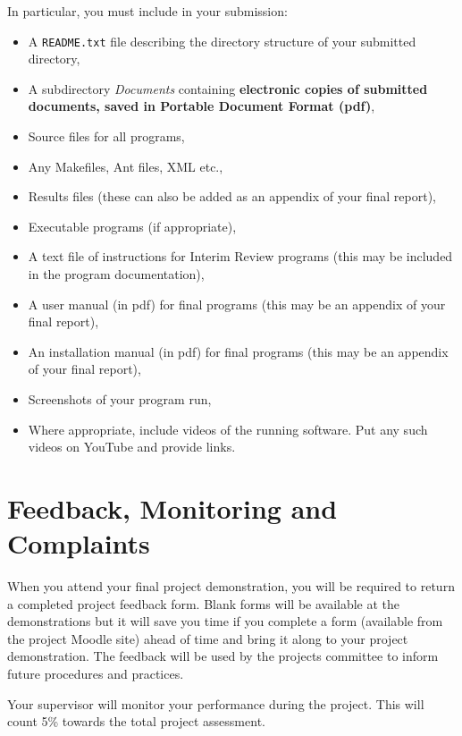 \documentclass[11pt]{article}
\newcommand{\supervisorweight}{5\% }
\begin{document}
In particular, you must include in your submission:

\begin{itemize}
\item A \texttt{README.txt} file describing the directory structure of your submitted directory,
\item A subdirectory  \textit{Documents} containing \textbf{electronic copies of submitted documents, saved in Portable Document Format (pdf)},
\item Source files for all programs,
\item Any Makefiles, Ant files, XML etc.,
\item Results files (these can also be added as an appendix of your final report),
\item Executable programs (if appropriate),
\item A text file of instructions for Interim Review programs (this may be included in the program documentation),
\item A user manual (in pdf) for final programs (this may  be an appendix of your final report),
\item An installation manual (in pdf) for final programs (this may  be an appendix of your final report),

\item Screenshots of your program run,

\item Where appropriate, include videos of the running software.  Put any such videos on YouTube and provide links. 
\end{itemize}


\newpage
\section{Feedback, Monitoring and Complaints}
\label{sec:feedback}
When you attend your final project demonstration, you will be required to return a completed project feedback form.  Blank forms will be available at the demonstrations but it will save you time if you complete a form  (available from the project Moodle site) ahead of time and bring it along to your project demonstration.  The feedback will be used  by the projects committee to inform future procedures and practices.

Your supervisor will monitor your performance during the project. This will count \supervisorweight towards the total project assessment.
\end{document}
